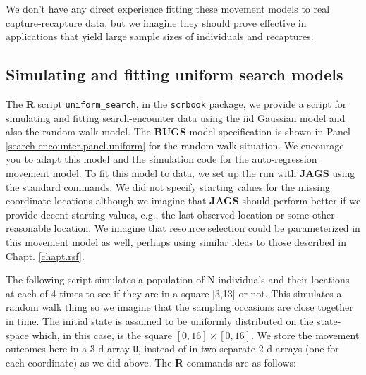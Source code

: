We don't have any direct experience fitting these movement models to
real capture-recapture data, but we imagine they should prove
effective in applications that yield large sample sizes of individuals
and recaptures.

\subsection{Simulating and fitting uniform search  models}

The {\bf R} script \mbox{\tt uniform\_search}, in the \mbox{\tt scrbook} package, we provide a script for simulating
and fitting search-encounter data using the iid Gaussian model and
also the random walk model.  The {\bf BUGS} model specification is
shown in Panel \ref{search-encounter.panel.uniform} for the random
walk situation. We encourage you to adapt this model and the
simulation code for the auto-regression movement model.  To fit this
model to data, we set up the run with {\bf JAGS} using the standard
commands. We did not specify starting values for the missing
coordinate locations although we imagine that {\bf JAGS} should
perform better if we provide decent starting values, e.g., the last
observed location or some other reasonable location.  We imagine that
resource selection could be parameterized in this movement model as
well, perhaps using similar ideas to those described in
Chapt. \ref{chapt.rsf}.

The following script simulates a population of N individuals and their
locations at each of 4 times to see if they are in a square [3,13] or
not.  This simulates a random walk thing so we imagine that the
sampling occasions are close together in time.  The initial state is
assumed to be uniformly distributed on the state-space which, in this
case, is the square $[0,16] \times [0,16]$. We store the movement
outcomes here in a 3-d array \mbox{\tt U}, instead of in two separate
2-d arrays (one for each coordinate) as we did above.  The {\bf R}
commands are as follows:

